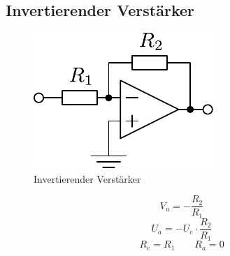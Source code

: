 



\subsection{Invertierender Verstärker}
\begin{figure}[h!]
	\centering
	\includegraphics[scale=\schscale]{../fig/op_inv.pdf}
	\caption{Invertierender Verstärker}
	\label{sch:op-inv}
\end{figure}
\[ V_u = - \frac{R_2}{R_1} \]
\[ U_a = - U_e \cdot \frac{R_2}{R_1} \]
\[ R_e = R_1 \qquad R_a = 0 \]